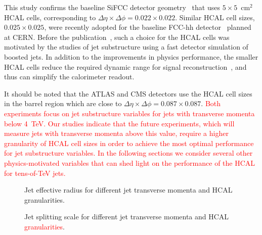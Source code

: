 This study confirms the baseline SiFCC detector geometry~\cite{Chekanov:2016ppq} that uses $5 \times 5$~cm$^2$ HCAL cells,
corresponding to $\Delta \eta \times \Delta \phi = 0.022\times0.022$.
Similar HCAL cell sizes,  $0.025\times0.025$,  were recently adopted for the baseline FCC-hh detector~\cite{fcc1,fcc2} planned at CERN.
Before the publication~\cite{Chekanov:2016ppq},   such a choice for the HCAL cells   
was motivated by the studies of jet substructure  using a fast detector simulation of boosted jets.
In addition to the improvements in physics performance, the smaller HCAL cells 
reduce the required dynamic range for 
signal reconstruction~\cite{Chekanov:2015ihl}, and thus can simplify the calorimeter readout.

It should be noted that the ATLAS and CMS detectors use the HCAL cell sizes in the barrel region which are close to 
$\Delta \eta \times \Delta \phi = 0.087\times 0.087$. \textcolor{red}{Both experiments focus on jet substructure variables for jets with 
transverse momenta below 4~TeV.
Our studies indicate that the future experiments, which will measure 
jets with transverse momenta above this value, require a higher
granularity of HCAL cell sizes in order to achieve the most optimal 
performance for jet substructure variables.
In the following sections we consider several other physics-motivated
variables that can shed light on the performance of the HCAL for tens-of-TeV jets.}


\begin{figure}
\begin{center}
\end{center}
\caption{Jet effective radius for different jet transverse momenta and HCAL granularities.}
\label{fig:eff_rad}
\end{figure}


\begin{figure}
\begin{center}
\end{center}
\caption{Jet splitting scale for different jet transverse momenta and HCAL \textcolor{red}{granularities}.}
\label{fig:d12}
\end{figure}


